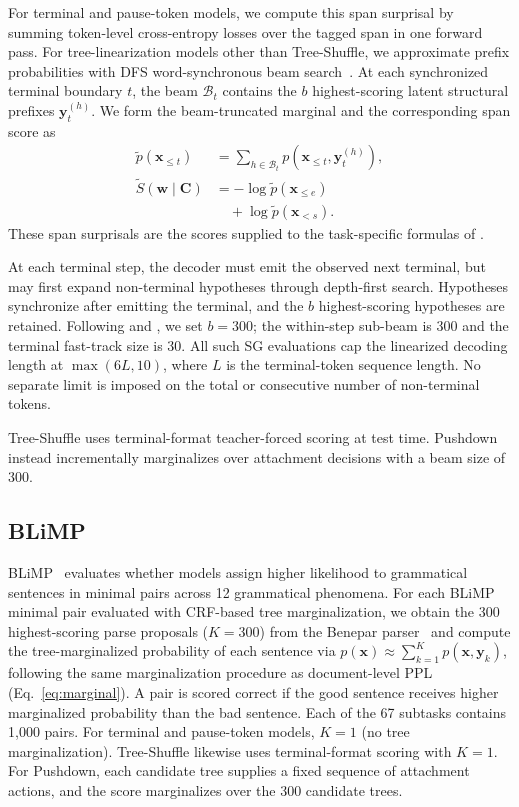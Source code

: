 \documentclass[11pt]{article}
\begin{document}
For terminal and pause-token models, we compute this span surprisal by summing token-level cross-entropy losses over the tagged span in one forward pass.
For tree-linearization models other than Tree-Shuffle, we approximate prefix probabilities with DFS word-synchronous beam search~\cite{stern-etal-2017-effective}.
At each synchronized terminal boundary $t$, the beam $\mathcal{B}_t$ contains the $b$ highest-scoring latent structural prefixes $\mathbf{y}^{(h)}_t$.
We form the beam-truncated marginal and the corresponding span score as
\[
\begin{aligned}
\widetilde{p}(\mathbf{x}_{\leq t})
  &= \sum_{h\in\mathcal{B}_t}
     p(\mathbf{x}_{\leq t},\mathbf{y}^{(h)}_t), \\
\widetilde{S}(\mathbf{w}\mid\mathbf{C})
  &= -\log\widetilde{p}(\mathbf{x}_{\leq e}) \\
  &\quad +\log\widetilde{p}(\mathbf{x}_{<s}).
\end{aligned}
\]
These span surprisals are the scores supplied to the task-specific formulas of \citet{hu-etal-2020-systematic}.

At each terminal step, the decoder must emit the observed next terminal, but may first expand non-terminal hypotheses through depth-first search.
Hypotheses synchronize after emitting the terminal, and the $b$ highest-scoring hypotheses are retained.
Following \citet{murty-etal-2023-pushdown} and \citet{sartran-etal-2022-transformer}, we set $b{=}300$; the within-step sub-beam is 300 and the terminal fast-track size is 30.
All such SG evaluations cap the linearized decoding length at $\max(6L,10)$, where $L$ is the terminal-token sequence length.
No separate limit is imposed on the total or consecutive number of non-terminal tokens.

Tree-Shuffle uses terminal-format teacher-forced scoring at test time. Pushdown instead incrementally marginalizes over attachment decisions with a beam size of 300.

\subsection{BLiMP}
BLiMP~\cite{warstadt-etal-2020-blimp-benchmark} evaluates whether models assign higher likelihood to grammatical sentences in minimal pairs across 12 grammatical phenomena.
For each BLiMP minimal pair evaluated with CRF-based tree marginalization, we obtain the 300 highest-scoring parse proposals ($K=300$) from the Benepar parser~\cite{kitaev-klein-2018-constituency} and compute the tree-marginalized probability of each sentence via $p(\mathbf{x}) \approx \sum_{k=1}^{K} p(\mathbf{x}, \mathbf{y}_k)$, following the same marginalization procedure as document-level PPL (Eq.~\ref{eq:marginal}).
A pair is scored correct if the good sentence receives higher marginalized probability than the bad sentence.
Each of the 67 subtasks contains 1,000 pairs.
For terminal and pause-token models, $K=1$ (no tree marginalization).
Tree-Shuffle likewise uses terminal-format scoring with $K=1$. For Pushdown, each candidate tree supplies a fixed sequence of attachment actions, and the score marginalizes over the 300 candidate trees.
\end{document}
